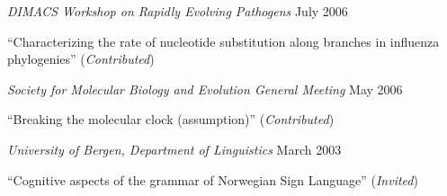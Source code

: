 \documentclass[10pt]{article}
\newenvironment{outerlist}[1][\enskip\textbullet]%
        {\begin{itemize}[#1]}{\end{itemize}%
         \vspace{-.6\baselineskip}}
\newenvironment{innerlist}[1][\enskip\textbullet]%
        {\begin{compactitem}[#1]}{\end{compactitem}}
\begin{document}
\begin{outerlist}
\item[] \textit{DIMACS Workshop on Rapidly Evolving Pathogens}%
        \hfill {July 2006}
\begin{innerlist}
\item ``Characterizing the rate of nucleotide substitution along branches in influenza phylogenies'' (\emph{Contributed})
\end{innerlist}
\end{outerlist} 

\begin{outerlist}
\item[] \textit{Society for Molecular Biology and Evolution General Meeting}%
        \hfill {May 2006}
\begin{innerlist}
\item ``Breaking the molecular clock (assumption)'' (\emph{Contributed})
\end{innerlist}
\end{outerlist} 

\begin{outerlist}
\item[] \textit{University of Bergen, Department of Linguistics}%
        \hfill {March 2003}
\begin{innerlist}
\item ``Cognitive aspects of the grammar of Norwegian Sign Language'' (\emph{Invited})
\end{innerlist}
\end{outerlist} 
\end{document}
